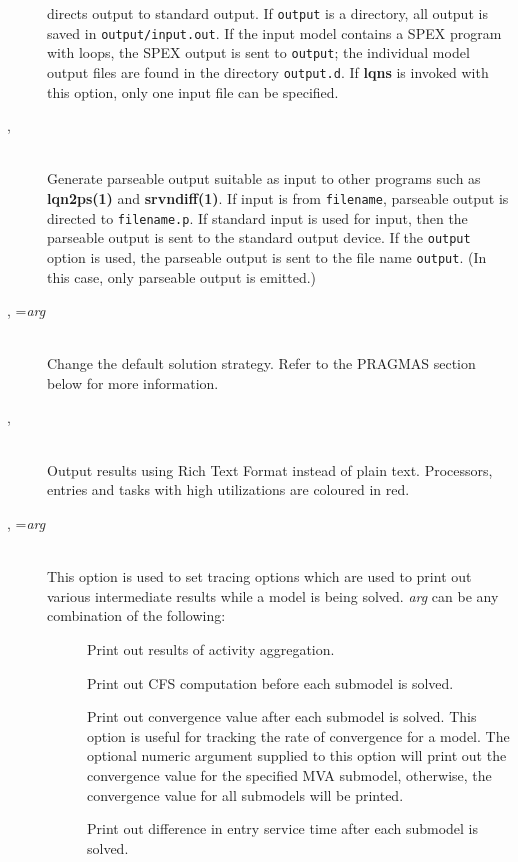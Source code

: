\begin{description}
directs output to standard output.  If \texttt{output} is a directory, all output is saved in \texttt{output/input.out}. If the input model contains a SPEX program with loops, the SPEX output is sent to \texttt{output}; the individual model output files are found in the directory \texttt{output.d}. If \textbf{lqns} is invoked with this
option, only one input file can be specified.
\item[\flag{p}{}, \longopt{parseable}]~\\
Generate parseable output suitable as input to other programs such as
\textbf{lqn2ps(1)} and \textbf{srvndiff(1)}.  If input is from
\texttt{filename}, parseable output is directed to \texttt{filename.p}.
If standard input is used for input, then the parseable output is sent
to the standard output device.  If the \texttt{output} option is used, the
parseable output is sent to the file name \texttt{output}.
(In this case, only parseable output is emitted.)
\item[\flag{P}{}, \longopt{pragma}=\emph{arg}]~\\
Change the default solution strategy.  Refer to the PRAGMAS section
below for more information.
\item[\flag{r}{}, \longopt{rtf}]~\\
Output results using Rich Text Format instead of plain text.  Processors, entries and tasks with high utilizations are coloured in red.
\item[\flag{t}{}, \longopt{trace}=\emph{arg}]~\\
This option is used to set tracing  options which are used to print out various
intermediate results  while a model is being solved.
\emph{arg} can be any combination of the following:
\begin{description}
\item[]
Print out results of activity aggregation.
\item[]
Print out CFS computation before each submodel is solved.
\item[]
Print out convergence value after each submodel is solved.
This option is useful for tracking the rate of convergence for a model.
The optional numeric argument supplied to this option will print out the convergence value for the specified MVA submodel, otherwise,
the convergence value for all submodels will be printed.
\item[]
Print out difference in entry service time after each submodel is solved.

\end{description}
\end{description}
